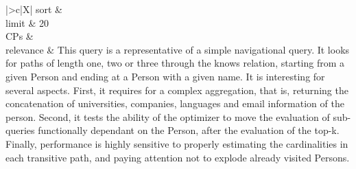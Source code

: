 \begin{tabularx}{\queryCardWidth}{|>{\queryPropertyCell}c|X|}
%
	sort        &
        \innerCardVSpace \\ \hline
	limit & 20 \\ \hline
	CPs &
	 \\ \hline
    relevance &
        \small This query is a representative of a simple navigational query. It looks for paths of length one, two or three through
the knows relation, starting from a given Person and ending at a Person with a given name. It is interesting for several
aspects. First, it requires for a complex aggregation, that is, returning the concatenation of universities, companies,
languages and email information of the person. Second, it tests the ability of the optimizer to move the evaluation of
sub-queries functionally dependant on the Person, after the evaluation of the top-k. Finally, performance is
highly sensitive to properly estimating the cardinalities in each transitive path, and paying attention not to explode
already visited Persons.
 \\ \hline%
\end{tabularx}
\queryCardVSpace